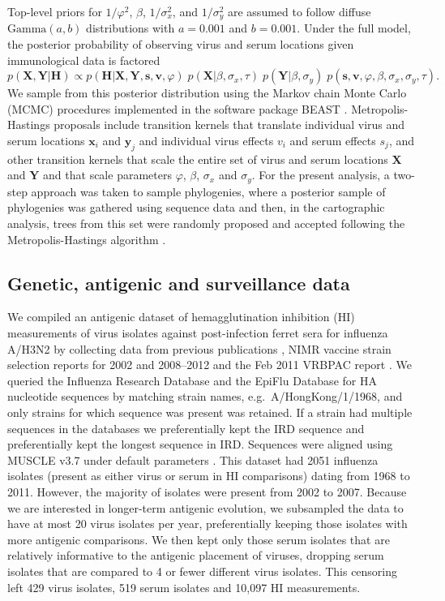 \documentclass[11pt,oneside,letterpaper]{article}
\newcommand{\virus}{\mathbf{x}}						%
\newcommand{\serum}{\mathbf{y}}						%
\newcommand{\viruses}{\mathbf{X}}					%
\newcommand{\sera}{\mathbf{Y}}						%
\newcommand{\ve}{v}									%
\newcommand{\se}{s}									%
\newcommand{\ves}{\mathbf{v}}						%
\newcommand{\ses}{\mathbf{s}}						%
\newcommand{\mdssd}{\varphi}						%
\newcommand{\virussd}{\sigma_x}						%
\newcommand{\serumsd}{\sigma_y}						%
\newcommand{\tree}{\tau}							%
\begin{document}
Top-level priors for $1/\mdssd^2$, $\beta$, $1/\virussd^2$, and $1/\serumsd^2$ are assumed to follow diffuse $\mbox{Gamma}(a, b)$ distributions  with $a=0.001$ and $b=0.001$.
Under the full model, the posterior probability of observing virus and serum locations given immunological data is factored
\begin{equation}
	p(\viruses,\sera | \mathbf{H}) \propto p(\mathbf{H} | \viruses, \sera, \ses, \ves, \mdssd) \; 
	p(\viruses | \beta, \virussd, \tree) \;
	p(\sera | \beta, \serumsd) \; 
	p(\ses, \ves, \mdssd, \beta, \virussd, \serumsd, \tree).
\end{equation}
We sample from this posterior distribution using the Markov chain Monte Carlo (MCMC) procedures implemented in the software package BEAST \cite{BEAST,BEAST17}.
Metropolis-Hastings proposals include transition kernels that translate individual virus and serum locations $\virus_i$ and $\serum_j$ and individual virus effects $\ve_i$ and serum effects $\se_j$, and other transition kernels that scale the entire set of virus and serum locations $\viruses$ and $\sera$ and that scale parameters $\mdssd$, $\beta$, $\virussd$ and $\serumsd$.
For the present analysis, a two-step approach was taken to sample phylogenies, where a posterior sample of phylogenies was gathered using sequence data and then, in the cartographic analysis, trees from this set were randomly proposed and accepted following the Metropolis-Hastings algorithm \cite{Pagel04}.

\subsection*{Genetic, antigenic and surveillance data}

We compiled an antigenic dataset of hemagglutination inhibition (HI) measurements of virus isolates against post-infection ferret sera for influenza A/H3N2 by collecting data from previous publications \cite{Hay01,Smith04,Russell08,Barr10}, NIMR vaccine strain selection reports for 2002 and 2008--2012 \cite{NIMR02,NIMRMarch08,NIMRFeb09,NIMRFeb10,NIMRSep10,NIMRSep11,NIMRFeb12} and the Feb 2011 VRBPAC report \cite{Cox11FDA}.
We queried the Influenza Research Database \cite{IRD} and the EpiFlu Database \cite{GISAID} for HA nucleotide sequences by matching strain names, e.g.\ A/HongKong/1/1968, and only strains for which sequence was present was retained.
If a strain had multiple sequences in the databases we preferentially kept the IRD sequence and preferentially kept the longest sequence in IRD. 
Sequences were aligned using MUSCLE v3.7 under default parameters \cite{MUSCLE}.
This dataset had 2051 influenza isolates (present as either virus or serum in HI comparisons) dating from 1968 to 2011. 
However, the majority of isolates were present from 2002 to 2007. 
Because we are interested in longer-term antigenic evolution, we subsampled the data to have at most 20 virus isolates per year, preferentially keeping those isolates with more antigenic comparisons. 
We then kept only those serum isolates that are relatively informative to the antigenic placement of viruses, dropping serum isolates that are compared to 4 or fewer different virus isolates.
This censoring left 429 virus isolates, 519 serum isolates and 10,097 HI measurements. 
\end{document}
